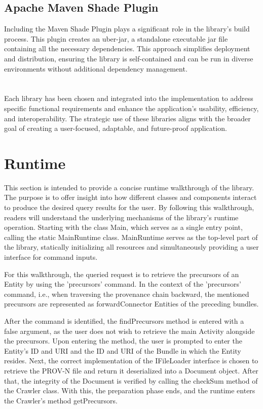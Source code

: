 \documentclass[
  digital,     %
  oneside,     %
  nosansbold,  %
  nocolorbold, %
  lof,         %
  lot,         %
]{fithesis4}
\begin{document}
\subsection{Apache Maven Shade Plugin}
Including the Maven Shade Plugin plays a significant role in the library's build process. This plugin creates an uber-jar, a standalone executable jar file containing all the necessary dependencies. This approach simplifies deployment and distribution, ensuring the library is self-contained and can be run in diverse environments without additional dependency management.


\section*{}
Each library has been chosen and integrated into the implementation to address specific functional requirements and enhance the application's usability, efficiency, and interoperability. The strategic use of these libraries aligns with the broader goal of creating a user-focused, adaptable, and future-proof application.

\section{Runtime}
This section is intended to provide a concise runtime walkthrough of the library. The purpose is to offer insight into how different classes and components interact to produce the desired query results for the user. By following this walkthrough, readers will understand the underlying mechanisms of the library's runtime operation. Starting with the class Main, which serves as a single entry point, calling the static MainRuntime class. MainRuntime serves as the top-level part of the library, statically initializing all resources and simultaneously providing a user interface for command inputs.

For this walkthrough, the queried request is to retrieve the precursors of an Entity by using the 'precursors' command. In the context of the 'precursors' command, i.e., when traversing the provenance chain backward, the mentioned precursors are represented as forwardConnector Entities of the preceding bundles.

After the command is identified, the findPrecursors method is entered with a false argument, as the user does not wish to retrieve the main Activity alongside the precursors. Upon entering the method, the user is prompted to enter the Entity's ID and URI and the ID and URI of the Bundle in which the Entity resides. Next, the correct implementation of the IFileLoader interface is chosen to retrieve the PROV-N file and return it deserialized into a Document object. After that, the integrity of the Document is verified by calling the checkSum method of the Crawler class. With this, the preparation phase ends, and the runtime enters the Crawler's method getPrecursors.
\end{document}

